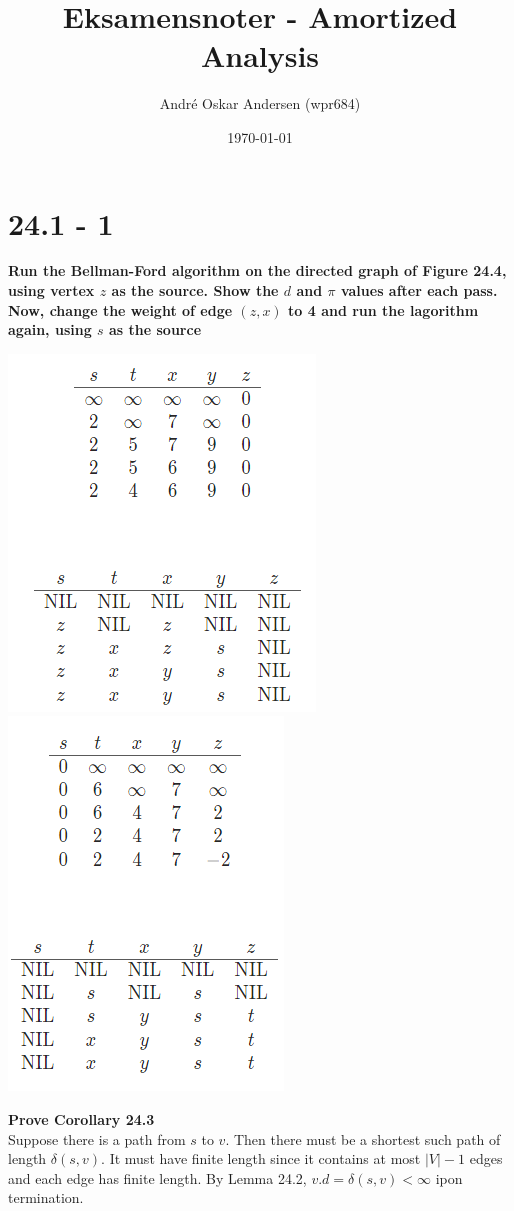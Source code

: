 \documentclass{report}
\title{Eksamensnoter - Amortized Analysis}
\author{André Oskar Andersen (wpr684)}
\date{\today}
\begin{document}
\maketitle

\section*{24.1 - 1}
\textbf{Run the Bellman-Ford algorithm on the directed graph of Figure 24.4, using vertex $z$ as the source. Show the $d$ and $\pi$ values after each pass. Now, change the weight of edge $(z, x)$ to 4 and run the lagorithm again, using $s$ as the source}
\begin{center}
    \includegraphics[width = 6 cm]{../entities/24_1_1_first.png}
    \includegraphics[width = 6 cm]{../entities/24_1_1_second.png}
\end{center}

\textbf{Prove Corollary 24.3} \\
Suppose there is a path from $s$ to $v$. Then there must be a shortest such path of length $\delta(s, v)$. It must have finite length since it contains at most $|V| - 1$ edges and each edge has finite length. By Lemma 24.2, $v.d = \delta(s, v) < \infty$ ipon termination.
\end{document}
